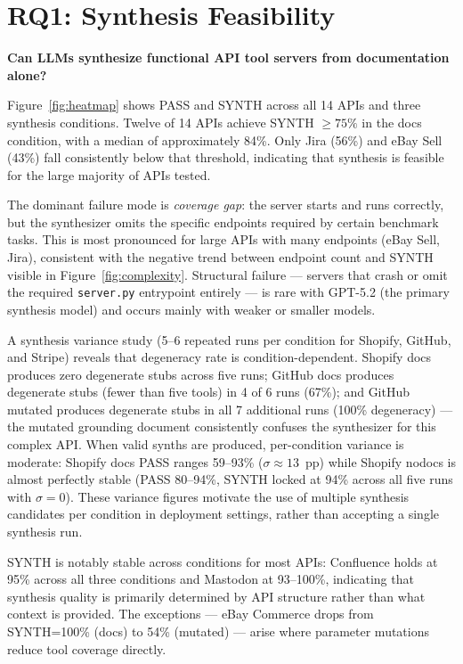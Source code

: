 \documentclass[12pt]{report}
\begin{document}
\section{RQ1: Synthesis Feasibility}
\label{sec:rq1}

\textbf{Can LLMs synthesize functional API tool servers from documentation alone?}

Figure~\ref{fig:heatmap} shows PASS and SYNTH across all 14 APIs and three
synthesis conditions. Twelve of 14 APIs achieve SYNTH $\geq 75\%$ in the
docs condition, with a median of approximately 84\%. Only Jira (56\%) and
eBay Sell (43\%) fall consistently below that threshold, indicating that
synthesis is feasible for the large majority of APIs tested.

The dominant failure mode is \emph{coverage gap}: the server starts and
runs correctly, but the synthesizer omits the specific endpoints required
by certain benchmark tasks. This is most pronounced for large APIs with many
endpoints (eBay Sell, Jira), consistent with the negative trend between
endpoint count and SYNTH visible in Figure~\ref{fig:complexity}. Structural
failure --- servers that crash or omit the required \texttt{server.py}
entrypoint entirely --- is rare with GPT-5.2 (the primary synthesis model)
and occurs mainly with weaker or smaller models.

A synthesis variance study (5--6 repeated runs per condition for Shopify,
GitHub, and Stripe) reveals that degeneracy rate is condition-dependent.
Shopify docs produces zero degenerate stubs across five runs; GitHub docs
produces degenerate stubs (fewer than five tools) in 4 of 6 runs (67\%);
and GitHub mutated produces degenerate stubs in all 7 additional runs (100\%
degeneracy) --- the mutated grounding document consistently confuses the
synthesizer for this complex API. When valid synths are produced, per-condition
variance is moderate: Shopify docs PASS ranges 59--93\% ($\sigma \approx 13$~pp)
while Shopify nodocs is almost perfectly stable (PASS 80--94\%, SYNTH locked
at 94\% across all five runs with $\sigma = 0$). These variance figures
motivate the use of multiple synthesis candidates per condition in deployment
settings, rather than accepting a single synthesis run.

SYNTH is notably stable across conditions for most APIs: Confluence holds
at 95\% across all three conditions and Mastodon at 93--100\%, indicating
that synthesis quality is primarily determined by API structure rather than
what context is provided. The exceptions --- eBay Commerce drops from
SYNTH=100\% (docs) to 54\% (mutated) --- arise where parameter mutations
reduce tool coverage directly.
\end{document}
